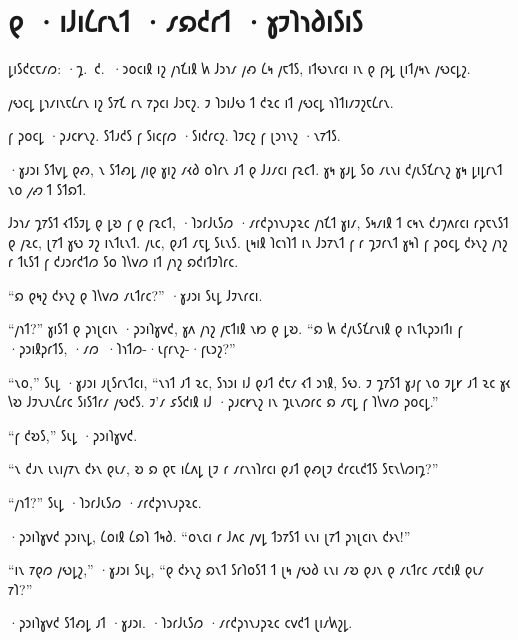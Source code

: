 \chapter[The Efficient Market Hypothesis]{𐑞 ·𐑦𐑓𐑦𐑖𐑩𐑯𐑑 ·𐑥𐑸𐑒𐑩𐑑 ·𐑣𐑲𐑐𐑪𐑔𐑦𐑕𐑦𐑕\protect\authorsnotefootnotemark}

\begin{chapterOpeningAuthorNote}
𐑛𐑦𐑕𐑒𐑤𐑱𐑥𐑼: ·𐑡.~𐑒.~·𐑮𐑴𐑤𐑦𐑙 𐑦𐑟 𐑢𐑪𐑗𐑦𐑙 𐑿 𐑓𐑮𐑪𐑥 𐑢𐑺 𐑖𐑰 𐑢𐑱𐑑𐑕, 𐑦𐑑𐑻𐑯𐑩𐑤𐑦 𐑦𐑯 𐑞 𐑝𐑶𐑛 𐑚𐑦𐑑𐑢𐑰𐑯 𐑢𐑻𐑤𐑛𐑟.
\end{chapterOpeningAuthorNote}
\begin{chapterOpeningQuote}
𐑢𐑻𐑤𐑛 𐑛𐑪𐑥𐑦𐑯𐑱𐑖𐑩𐑯 𐑦𐑟 𐑕𐑳𐑗 𐑩𐑯 𐑳𐑜𐑤𐑦 𐑓𐑮𐑱𐑟. 𐑲 𐑐𐑮𐑦𐑓𐑻 𐑑 𐑒𐑷𐑤 𐑦𐑑 𐑢𐑻𐑤𐑛 𐑪𐑐𐑑𐑦𐑥𐑲𐑟𐑱𐑖𐑩𐑯.
\end{chapterOpeningQuote}


 𐑝 𐑜𐑴𐑤𐑛 ·𐑜𐑨𐑤𐑾𐑯𐑟. 𐑕𐑑𐑨𐑒𐑕 𐑝 𐑕𐑦𐑤𐑝𐑼 ·𐑕𐑦𐑒𐑩𐑤𐑟. 𐑐𐑲𐑤𐑟 𐑝 𐑚𐑮𐑪𐑯𐑟 ·𐑯𐑳𐑑𐑕.

\hplettrineextrapara
·𐑣𐑨𐑮𐑦 𐑕𐑑𐑫𐑛 𐑞𐑺, 𐑯 𐑕𐑑𐑺𐑛 𐑢𐑦𐑞 𐑣𐑦𐑟 𐑥𐑬𐑔 𐑴𐑐𐑩𐑯 𐑨𐑑 𐑞 𐑓𐑨𐑥𐑤𐑦 𐑝𐑷𐑤𐑑. 𐑣𐑰 𐑣𐑨𐑛 𐑕𐑴 𐑥𐑧𐑯𐑦 𐑒𐑢𐑧𐑕𐑗𐑩𐑯𐑟 𐑣𐑰 𐑛𐑦𐑛𐑩𐑯𐑑 𐑯𐑴 \emph{𐑢𐑺} 𐑑 𐑕𐑑𐑸𐑑.

𐑓𐑮𐑪𐑥 𐑡𐑳𐑕𐑑 𐑬𐑑𐑕𐑲𐑛 𐑞 𐑛𐑹 𐑝 𐑞 𐑝𐑷𐑤𐑑, ·𐑐𐑮𐑩𐑓𐑧𐑕𐑼 ·𐑥𐑩𐑒𐑜𐑪𐑯𐑨𐑜𐑷𐑤 𐑢𐑪𐑗𐑑 𐑣𐑦𐑥, 𐑕𐑰𐑥𐑦𐑙 𐑑 𐑤𐑰𐑯 𐑒𐑨𐑠𐑵𐑩𐑤𐑦 𐑩𐑜𐑱𐑯𐑕𐑑 𐑞 𐑢𐑷𐑤, 𐑚𐑳𐑑 𐑣𐑻 𐑲𐑟 𐑦𐑯𐑑𐑧𐑯𐑑. 𐑢𐑧𐑤, 𐑞𐑨𐑑 𐑥𐑱𐑛 𐑕𐑧𐑯𐑕. 𐑚𐑰𐑦𐑙 𐑐𐑤𐑪𐑐𐑑 𐑦𐑯 𐑓𐑮𐑳𐑯𐑑 𐑝 𐑩 𐑡𐑲𐑩𐑯𐑑 𐑣𐑰𐑐 𐑝 𐑜𐑴𐑤𐑛 𐑒𐑶𐑯𐑟 𐑢𐑪𐑟 𐑩 𐑑𐑧𐑕𐑑 𐑝 𐑒𐑨𐑮𐑩𐑒𐑑𐑼 𐑕𐑴 𐑐𐑘𐑫𐑼 𐑦𐑑 𐑢𐑪𐑟 𐑸𐑒𐑦𐑑𐑲𐑐𐑩𐑤.

“𐑸 𐑞𐑰𐑟 𐑒𐑶𐑯𐑟 𐑞 𐑐𐑘𐑫𐑼 𐑥𐑧𐑑𐑩𐑤?” ·𐑣𐑨𐑮𐑦 𐑕𐑧𐑛 𐑓𐑲𐑯𐑩𐑤𐑦.

“𐑢𐑪𐑑?” 𐑣𐑦𐑕𐑑 𐑞 𐑜𐑪𐑚𐑤𐑦𐑯 ·𐑜𐑮𐑦𐑐𐑣𐑫𐑒, 𐑣𐑵 𐑢𐑪𐑟 𐑢𐑱𐑑𐑦𐑙 𐑯𐑽 𐑞 𐑛𐑹. “𐑸 𐑿 𐑒𐑢𐑧𐑕𐑗𐑩𐑯𐑦𐑙 𐑞 𐑦𐑯𐑑𐑧𐑜𐑮𐑦𐑑𐑦 𐑝 ·𐑜𐑮𐑦𐑙𐑜𐑩𐑑𐑕, ·𐑥𐑼~·𐑐𐑪𐑑𐑼-·𐑧𐑝𐑩𐑯𐑟-·𐑝𐑧𐑮𐑟?”

“𐑯𐑴,” 𐑕𐑧𐑛 ·𐑣𐑨𐑮𐑦 𐑨𐑚𐑕𐑩𐑯𐑑𐑤𐑦, “𐑯𐑪𐑑 𐑨𐑑 𐑷𐑤, 𐑕𐑪𐑮𐑦 𐑦𐑓 𐑞𐑨𐑑 𐑒𐑱𐑥 𐑬𐑑 𐑮𐑪𐑙, 𐑕𐑻. 𐑲 𐑡𐑳𐑕𐑑 𐑣𐑨𐑝 𐑯𐑴 𐑲𐑛𐑾 𐑨𐑑 𐑷𐑤 𐑣𐑬 𐑘𐑹 𐑓𐑲𐑯𐑨𐑯𐑖𐑩𐑤 𐑕𐑦𐑕𐑑𐑩𐑥 𐑢𐑻𐑒𐑕. 𐑲'𐑥 𐑭𐑕𐑒𐑦𐑙 𐑦𐑓 ·𐑜𐑨𐑤𐑾𐑯𐑟 𐑦𐑯 𐑡𐑧𐑯𐑼𐑩𐑤 𐑸 𐑥𐑱𐑛 𐑝 𐑐𐑘𐑫𐑼 𐑜𐑴𐑤𐑛.”

“𐑝 𐑒𐑹𐑕,” 𐑕𐑧𐑛 ·𐑜𐑮𐑦𐑐𐑣𐑫𐑒.

“𐑯 𐑒𐑨𐑯 𐑧𐑯𐑦𐑢𐑳𐑯 𐑒𐑶𐑯 𐑞𐑧𐑥, 𐑹 𐑸 𐑞𐑱 𐑦𐑖𐑵𐑛 𐑚𐑲 𐑩 𐑥𐑩𐑯𐑪𐑐𐑩𐑤𐑦 𐑞𐑨𐑑 𐑞𐑺𐑚𐑲 𐑒𐑩𐑤𐑧𐑒𐑑𐑕 𐑕𐑱𐑯𐑘𐑼𐑦𐑡?”

“𐑢𐑪𐑑?” 𐑕𐑧𐑛 ·𐑐𐑮𐑩𐑓𐑧𐑕𐑼 ·𐑥𐑩𐑒𐑜𐑪𐑯𐑨𐑜𐑷𐑤.

·𐑜𐑮𐑦𐑐𐑣𐑫𐑒 𐑜𐑮𐑦𐑯𐑛, 𐑖𐑴𐑦𐑙 𐑖𐑸𐑐 𐑑𐑰𐑔. “𐑴𐑯𐑤𐑦 𐑩 𐑓𐑵𐑤 𐑢𐑫𐑛 𐑑𐑮𐑳𐑕𐑑 𐑧𐑯𐑦 𐑚𐑳𐑑 𐑜𐑪𐑚𐑤𐑦𐑯 𐑒𐑶𐑯!”

“𐑦𐑯 𐑳𐑞𐑼 𐑢𐑻𐑛𐑟,” ·𐑣𐑨𐑮𐑦 𐑕𐑧𐑛, “𐑞 𐑒𐑶𐑯𐑟 𐑸𐑯𐑑 𐑕𐑩𐑐𐑴𐑕𐑑 𐑑 𐑚𐑰 𐑢𐑻𐑔 𐑧𐑯𐑦 𐑥𐑹 𐑞𐑨𐑯 𐑞 𐑥𐑧𐑑𐑩𐑤 𐑥𐑱𐑒𐑦𐑙 𐑞𐑧𐑥 𐑳𐑐?”

·𐑜𐑮𐑦𐑐𐑣𐑫𐑒 𐑕𐑑𐑺𐑛 𐑨𐑑 ·𐑣𐑨𐑮𐑦. ·𐑐𐑮𐑩𐑓𐑧𐑕𐑼 ·𐑥𐑩𐑒𐑜𐑪𐑯𐑨𐑜𐑷𐑤 𐑤𐑫𐑒𐑑 𐑚𐑦𐑥𐑿𐑟𐑛.

